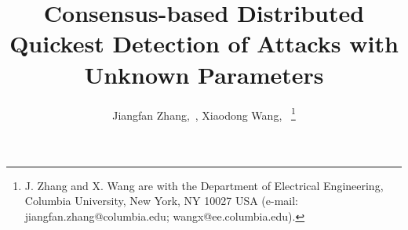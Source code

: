 \documentclass[11pt, draftclsnofoot, onecolumn]{IEEEtran}
\begin{document}
%
\title{Consensus-based Distributed Quickest Detection of Attacks with Unknown Parameters}
%
%
%

\author{{Jiangfan Zhang,~,  Xiaodong Wang,~
}
\thanks{J. Zhang and X. Wang are with the Department of Electrical Engineering, Columbia University, New York, NY 10027 USA (e-mail: jiangfan.zhang@columbia.edu; wangx@ee.columbia.edu).}

}





\maketitle
\end{document}

